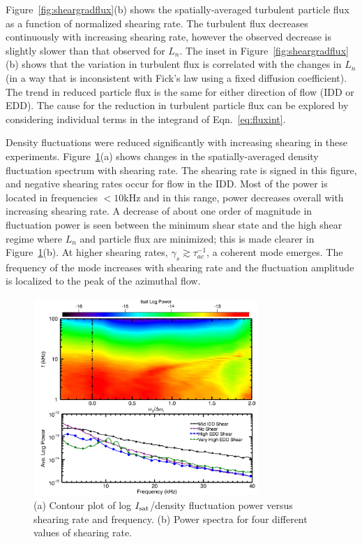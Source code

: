 \documentclass[aps,prl,amsmath,amssymb,reprint,superscriptaddress]{revtex4-1} %
\begin{document}
Figure~\ref{fig:sheargradflux}(b) shows the spatially-averaged turbulent
particle flux as a function of normalized shearing rate.  The
turbulent flux decreases continuously with increasing shearing rate,
however the observed decrease is slightly slower than that observed
for $L_n$.  The inset in Figure~\ref{fig:sheargradflux}(b) shows that the variation in
turbulent flux is correlated with the changes in $L_n$ (in a way
that is inconsistent with Fick's law using a fixed diffusion coefficient).  The
trend in reduced particle flux is the same for either direction of
flow (IDD or EDD).  The cause for the reduction in turbulent particle
flux can be explored by considering individual terms in the integrand
of Eqn.~\ref{eq:fluxint}.



Density fluctuations were reduced significantly with increasing
shearing in these experiments.  Figure~\ref{fig:powercontour}(a) shows
changes in the spatially-averaged density fluctuation spectrum
with shearing rate.  The shearing rate is signed in this figure, and
negative shearing rates occur for flow in the IDD. Most of the power
is located in frequencies $<10$kHz and in this range, power decreases
overall with increasing shearing rate.  A decrease of about one order
of magnitude in fluctuation power is seen between the minimum shear
state and the high shear regime where $L_n$ and particle flux are
minimized; this is made clearer in Figure~\ref{fig:powercontour}(b).  At
higher shearing rates, $\gamma_{s} \gtrsim \tau_{ac}^{-1}$, a coherent
mode emerges.  The frequency of the mode increases with shearing rate
and the fluctuation amplitude is localized to the peak of the
azimuthal flow.

\begin{figure}[!htbp]
\centerline{
\includegraphics[width=8.5cm]{powercontour.pdf}}
\caption{\label{fig:powercontour} (a) Contour plot of log $I_{\rm sat}$/density fluctuation power versus shearing rate and frequency. (b) Power spectra for four different values of shearing rate.}
\end{figure}
\end{document}
